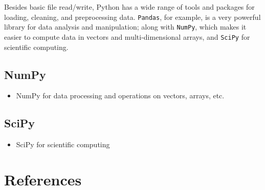 \documentclass[
  letterpaper,
]{scrbook}
\providecommand{\tightlist}{%
  \setlength{\itemsep}{0pt}\setlength{\parskip}{0pt}}
\begin{document}
Besides basic file read/write, Python has a wide range of tools and
packages for loading, cleaning, and preprocessing data. \texttt{Pandas},
for example, is a very powerful library for data analysis and
manipulation; along with \texttt{NumPy}, which makes it easier to
compute data in vectors and multi-dimensional arrays, and \texttt{SciPy}
for scientific computing.

\subsection*{NumPy}\label{numpy}

\begin{itemize}
\tightlist
\item
  NumPy for data processing and operations on vectors, arrays, etc.
\end{itemize}

\subsection*{SciPy}\label{scipy}

\begin{itemize}
\tightlist
\item
  SciPy for scientific computing
\end{itemize}

\section*{References}\label{references}

\end{document}
